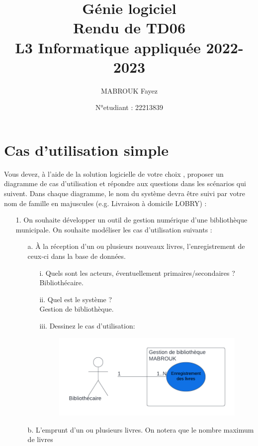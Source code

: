 \documentclass[12pt]{article}
\author{MABROUK Fayez}
\date{N°etudiant : 22213839}
\title{{\bf  Génie logiciel} \\
	Rendu de TD06\\
	{\small L3 Informatique appliquée 2022-2023} \\
	{\it \small }}
\begin{document}
	\maketitle
	\newpage
	\section{Cas d'utilisation simple}
	Vous devez, à l’aide de la solution logicielle de votre choix , proposer un diagramme de cas d’utilisation et répondre aux questions dans les
	scénarios qui suivent. Dans chaque diagramme, le nom du système devra être suivi par votre nom de
	famille en majuscules (e.g. Livraison à domicile LOBRY) :
	\begin{itemize}
		\item[1. ] On souhaite développer un outil de gestion numérique d’une bibliothèque municipale. On
		souhaite modéliser les cas d’utilisation suivants :
		\begin{itemize}
			\item[a. ] À la réception d’un ou plusieurs nouveaux livres, l’enregistrement de ceux-ci dans la
			base de données.
			\begin{itemize}
				\item[i. ] Quels sont les acteurs, éventuellement primaires/secondaires ?\\
				Bibliothécaire.
				\item[ii. ] Quel est le système ?\\
				Gestion de bibliothèque.
				\item[iii. ] Dessinez le cas d’utilisation:
					\begin{figure}[!hbtp]
					\includegraphics[scale=0.75]{capture1.PNG}
				\end{figure}
			\end{itemize}
		\item[b. ] L’emprunt d’un ou plusieurs livres. On notera que le nombre maximum de livres

\end{itemize}
\end{itemize}
\end{document}
